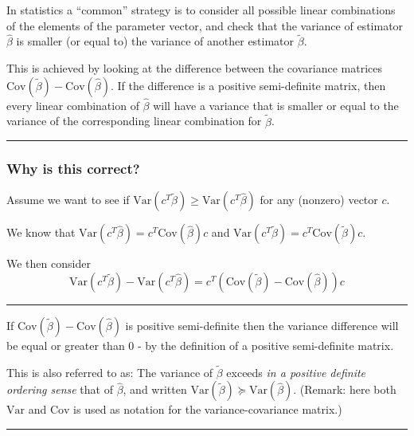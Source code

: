 \documentclass[
  letterpaper,
  DIV=11,
  numbers=noendperiod]{scrartcl}
\begin{document}
In statistics a ``common'' strategy is to consider all possible linear
combinations of the elements of the parameter vector, and check that the
variance of estimator \(\hat{\beta}\) is smaller (or equal to) the
variance of another estimator \(\tilde{\beta}\).

This is achieved by looking at the difference between the covariance
matrices \(\text{Cov}(\tilde{\beta})-\text{Cov}(\hat{\beta})\). If the
difference is a positive semi-definite matrix, then every linear
combination of \(\hat{\beta}\) will have a variance that is smaller or
equal to the variance of the corresponding linear combination for
\(\tilde{\beta}\).

\begin{center}\rule{0.5\linewidth}{0.5pt}\end{center}

\hypertarget{why-is-this-correct}{%
\subsubsection{Why is this correct?}\label{why-is-this-correct}}

Assume we want to see if
\(\text{Var}(c^T\tilde{\beta})\ge \text{Var}(c^T\hat{\beta})\) for any
(nonzero) vector \(c\).

We know that \(\text{Var}(c^T\hat{\beta})=c^T \text{Cov}(\hat{\beta})c\)
and \(\text{Var}(c^T\tilde{\beta})=c^T \text{Cov}(\tilde{\beta})c\).

We then consider
\[\text{Var}(c^T\tilde{\beta})- \text{Var}(c^T\hat{\beta})=c^T(\text{Cov}(\tilde{\beta})-\text{Cov}(\hat{\beta}))c\]

\begin{center}\rule{0.5\linewidth}{0.5pt}\end{center}

If \(\text{Cov}(\tilde{\beta})-\text{Cov}(\hat{\beta})\) is positive
semi-definite then the variance difference will be equal or greater than
0 - by the definition of a positive semi-definite matrix.

This is also referred to as: The variance of \(\tilde{\beta}\) exceeds
\emph{in a positive definite ordering sense} that of \(\hat{\beta}\),
and written
\(\text{Var}(\tilde{\beta}) \succeq \text{Var}(\hat{\beta})\). (Remark:
here both \(\text{Var}\) and \(\text{Cov}\) is used as notation for the
variance-covariance matrix.)

\begin{center}\rule{0.5\linewidth}{0.5pt}\end{center}
\end{document}
